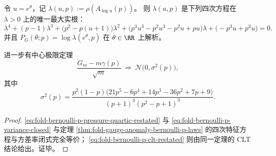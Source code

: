 \begin{theorem}\label{thm:fold-bernoulli-p-pressure-quartic-clt-variance}
令 \(u=e^\theta\)，记 \(\lambda(u,p):=\rho(A_{\log u}(p))\)。
则 \(\lambda(u,p)\) 是下列四次方程在 \(\lambda>0\) 上的唯一最大实根：
\begin{equation}\label{eq:fold-bernoulli-p-pressure-quartic-restated}
\lambda^4+(p-1)\lambda^3+\bigl(p^2-p(u+1)\bigr)\lambda^2
+\bigl(p^3u^3-p^2u^3-p^2u+pu\bigr)\lambda
+\bigl(-p^3u+p^2u\bigr)=0.
\end{equation}
并且 \(P_G(\theta;p)=\log\lambda(e^\theta,p)\) 在 \(\theta\in\RR\) 上解析。

进一步有中心极限定理
\begin{equation}\label{eq:fold-bernoulli-p-clt-restated}
\frac{G_m-m\gamma(p)}{\sqrt m}\ \Rightarrow\ \mathcal N\!\bigl(0,\sigma^2(p)\bigr),
\end{equation}
其中
\begin{equation}\label{eq:fold-bernoulli-p-variance-closed}
\sigma^2(p)=
\frac{p^2(1-p)\bigl(21 p^5-6 p^4+14 p^3-36 p^2+7 p+9\bigr)}
{(p+1)^3(p^2-p+1)^3}.
\end{equation}
\end{theorem}
\begin{proof}
\eqref{eq:fold-bernoulli-p-pressure-quartic-restated} 与
\eqref{eq:fold-bernoulli-p-variance-closed}
与定理 \ref{thm:fold-gauge-anomaly-bernoulli-p-laws} 的四次特征方程与方差率闭式完全等价；
\eqref{eq:fold-bernoulli-p-clt-restated} 则由同一定理的 CLT 结论给出。证毕。
\end{proof}

